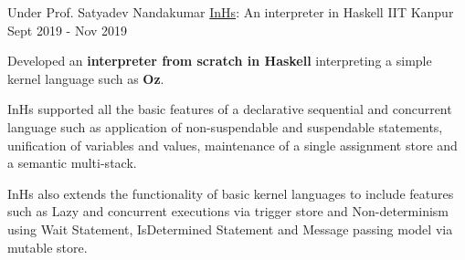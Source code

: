 

\begin{cventries}

  \cventry
    {Under Prof. Satyadev Nandakumar} %
    {\href{https://github.com/ayush268/InHs}{InHs}: An interpreter in Haskell} %
    {IIT Kanpur} %
    {Sept 2019 - Nov 2019} %
    {
      \begin{cvitems} %
      \item {Developed an \textbf{interpreter from scratch in Haskell} interpreting a simple kernel language such as \textbf{Oz}.}
      \item {InHs supported all the basic features of a declarative sequential and concurrent language such as application of non-suspendable and suspendable statements, unification of variables and values, maintenance of a single assignment store and a semantic multi-stack.}
      \item {InHs also extends the functionality of basic kernel languages to include features such as Lazy and concurrent executions via trigger store and Non-determinism using Wait Statement, IsDetermined Statement and Message passing model via mutable store.}
      \end{cvitems}
    }%




\end{cventries}
